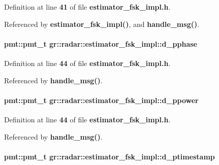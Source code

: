 Definition at line {\bf 41} of file {\bf estimator\+\_\+fsk\+\_\+impl.\+h}.



Referenced by {\bf estimator\+\_\+fsk\+\_\+impl()}, and {\bf handle\+\_\+msg()}.

\paragraph[{d\+\_\+pphase}]{\setlength{\rightskip}{0pt plus 5cm}pmt\+::pmt\+\_\+t gr\+::radar\+::estimator\+\_\+fsk\+\_\+impl\+::d\+\_\+pphase}\label{classgr_1_1radar_1_1estimator__fsk__impl_a8418dc7b645bfe0062af36a49bfbbe46}


Definition at line {\bf 44} of file {\bf estimator\+\_\+fsk\+\_\+impl.\+h}.



Referenced by {\bf handle\+\_\+msg()}.

\paragraph[{d\+\_\+ppower}]{\setlength{\rightskip}{0pt plus 5cm}pmt\+::pmt\+\_\+t gr\+::radar\+::estimator\+\_\+fsk\+\_\+impl\+::d\+\_\+ppower}\label{classgr_1_1radar_1_1estimator__fsk__impl_adbaf8932c5aad2c3e3a2a4dd656783e6}


Definition at line {\bf 44} of file {\bf estimator\+\_\+fsk\+\_\+impl.\+h}.



Referenced by {\bf handle\+\_\+msg()}.

\paragraph[{d\+\_\+ptimestamp}]{\setlength{\rightskip}{0pt plus 5cm}pmt\+::pmt\+\_\+t gr\+::radar\+::estimator\+\_\+fsk\+\_\+impl\+::d\+\_\+ptimestamp}\label{classgr_1_1radar_1_1estimator__fsk__impl_a952bb1bdf20432aa2e4a76541a5fbcba}


